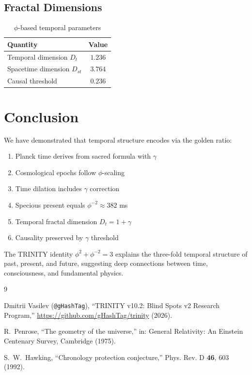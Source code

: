 \documentclass[12pt,a4paper]{article}
\begin{document}
\subsection{Fractal Dimensions}

\begin{table}[h]
\centering
\begin{tabular}{lc}
\toprule
Quantity & Value \\
\midrule
Temporal dimension $D_t$ & $1.236$ \\
Spacetime dimension $D_{st}$ & $3.764$ \\
Causal threshold & $0.236$ \\
\bottomrule
\end{tabular}
\caption{$\phi$-based temporal parameters}
\end{table}

\section{Conclusion}

We have demonstrated that temporal structure encodes via the golden ratio:
\begin{enumerate}
\item Planck time derives from sacred formula with $\gamma$
\item Cosmological epochs follow $\phi$-scaling
\item Time dilation includes $\gamma$ correction
\item Specious present equals $\phi^{-2} \approx 382$ ms
\item Temporal fractal dimension $D_t = 1 + \gamma$
\item Causality preserved by $\gamma$ threshold
\end{enumerate}

The TRINITY identity $\phi^2 + \phi^{-2} = 3$ explains the three-fold temporal structure of past, present, and future, suggesting deep connections between time, consciousness, and fundamental physics.

\begin{thebibliography}{9}

Dmitrii Vasilev (\texttt{@gHashTag}),
``TRINITY v10.2: Blind Spots v2 Research Program,''
\url{https://github.com/gHashTag/trinity} (2026).

R.~Penrose,
``The geometry of the universe,''
in: General Relativity: An Einstein Centenary Survey, Cambridge (1975).

S.~W.~Hawking,
``Chronology protection conjecture,''
Phys. Rev. D \textbf{46}, 603 (1992).

\end{thebibliography}
\end{document}
